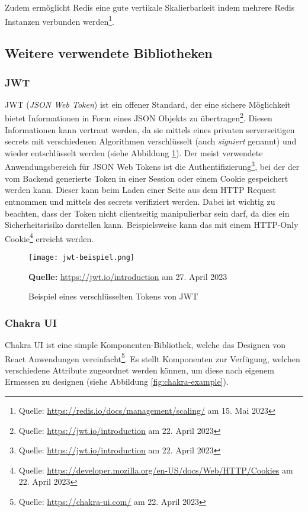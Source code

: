  Zudem ermöglicht Redis eine gute vertikale Skalierbarkeit indem mehrere Redis Instanzen verbunden werden\footnote{Quelle: \url{https://redis.io/docs/management/scaling/} am 15. Mai 2023}.
       
        \subsection{Weitere verwendete Bibliotheken}
        \label{sec:weiteres}
        \subsubsection{JWT}
        \label{sec:JWT}
JWT (\textit{JSON Web Token}) ist ein offener Standard, der eine sichere Möglichkeit bietet Informationen in Form eines JSON Objekts zu übertragen\footnote{Quelle: \url{https://jwt.io/introduction} am 22. April 2023}. Diesen Informationen kann vertraut werden, da sie mittels eines privaten serverseitigen secrets mit verschiedenen Algorithmen  verschlüsselt (auch \textit{signiert} genannt) und wieder entschlüsselt werden (siehe Abbildung \ref{fig:jwt-example}). Der meist verwendete Anwendungsbereich für JSON Web Tokens ist die Authentifizierung\footnote{Quelle: \url{https://jwt.io/introduction} am 22. April 2023}, bei der der vom Backend generierte Token in einer Session oder einem Cookie gespeichert werden kann. Dieser kann beim Laden einer Seite aus dem HTTP Request entnommen und mittels des secrets verifiziert werden. Dabei ist wichtig zu beachten, dass der Token nicht clientseitig manipulierbar sein darf, da dies ein Sicherheitsrisiko darstellen kann. Beispielsweise kann das mit einem HTTP-Only Cookie\footnote{Quelle: \url{https://developer.mozilla.org/en-US/docs/Web/HTTP/Cookies} am 22. April 2023} erreicht werden.

  \begin{figure}[!htb]
  \centering
  \texttt{[image: jwt-beispiel.png]}
  
  
\raggedleft
    \footnotesize\sffamily\textbf{Quelle:} \url{https://jwt.io/introduction} am 27. April 2023
  \caption{Beispiel eines verschlüsselten Tokens von JWT}
  \label{fig:jwt-example}
\end{figure}


        \subsubsection{Chakra UI}
        \label{sec:chakraUI}
Chakra UI ist eine simple Komponenten-Bibliothek, welche das Designen von React Anwendungen vereinfacht\footnote{Quelle: \url{https://chakra-ui.com/} am 22. April 2023}. Es stellt Komponenten zur Verfügung, welchen verschiedene Attribute zugeordnet werden können, um diese nach eigenem Ermessen zu designen (siehe Abbildung \ref{fig:chakra-example}).

